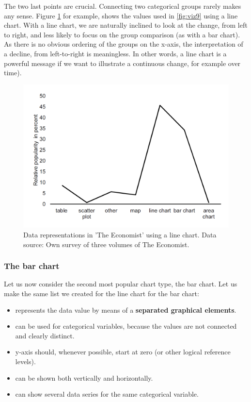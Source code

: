 \documentclass[]{book}
\providecommand{\tightlist}{%
  \setlength{\itemsep}{0pt}\setlength{\parskip}{0pt}}
\begin{document}
The two last points are crucial. Connecting two categorical groups rarely makes any sense. Figure \ref{fig:viz10} for example, shows the values used in \ref{fig:viz9} using a line chart. With a line chart, we are naturally inclined to look at the change, from left to right, and less likely to focus on the group comparison (as with a bar chart). As there is no obvious ordering of the groups on the x-axis, the interpretation of a decline, from left-to-right is meaningless. In other words, a line chart is a powerful message if we want to illustrate a continuous change, for example over time).

\begin{figure}

{\centering \includegraphics[width=0.48\linewidth]{_resources/chapter_viz/econline} 

}

\caption{Data representations in 'The Economist' using a line chart. Data source: Own survey  of three volumes of The Economist.}\label{fig:viz10}
\end{figure}

\hypertarget{the-bar-chart}{%
\subsubsection{The bar chart}\label{the-bar-chart}}

Let us now consider the second most popular chart type, the bar chart. Let us make the same list we created for the line chart for the bar chart:

\begin{itemize}
\tightlist
\item
  represents the data value by means of a \textbf{separated graphical elements}.
\item
  can be used for categorical variables, because the values are not connected and clearly distinct.
\item
  y-axis should, whenever possible, start at zero (or other logical reference levels).
\item
  can be shown both vertically and horizontally.
\item
  can show several data series for the same categorical variable.
\end{itemize}
\end{document}
